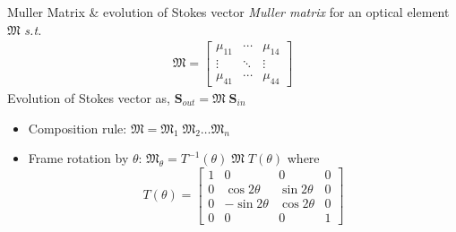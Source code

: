 \documentclass[12pt, dvipsnames]{beamer}
\numberwithin{equation}{section}
\begin{document}
\begin{frame}{Muller Matrix \& evolution of Stokes vector}
	\textit{Muller matrix} for an optical element $\boldsymbol{\mathfrak{M}}$ \textit{s.t.} 
	\begin{align*}\boldsymbol{\mathfrak{M}}=
		\begin{bmatrix}
			\mu_{11} & \cdots & \mu_{14}\\
			\vdots & \ddots & \vdots\\
			\mu_{41} & \cdots & \mu_{44}
		\end{bmatrix}
	\end{align*}\pause
	Evolution of Stokes vector as,
	$\boldsymbol{S}_{out}=\boldsymbol{\mathfrak{M}}\;\boldsymbol{S}_{in}$\pause
	\begin{itemize}
		\item Composition rule: $\boldsymbol{\mathfrak{M}}=\boldsymbol{\mathfrak{M}}_1\;\boldsymbol{\mathfrak{M}}_2 \dots {\boldsymbol{\mathfrak{M}}_n}$
		\item Frame rotation by $\theta$:
		$\boldsymbol{\mathfrak{M}}_\theta = T^{-1}(\theta)\;\boldsymbol{\mathfrak{M}}\;T(\theta)$ where $$			T(\theta)=
			\begin{bmatrix}
				1 & 0 & 0 & 0\\
				0 & \cos2\theta & \sin2\theta & 0 \\
				0 & -\sin2\theta & \cos2\theta & 0\\
				0 & 0 & 0 & 1
			\end{bmatrix}$$
	\end{itemize}
\end{frame}
\end{document}

